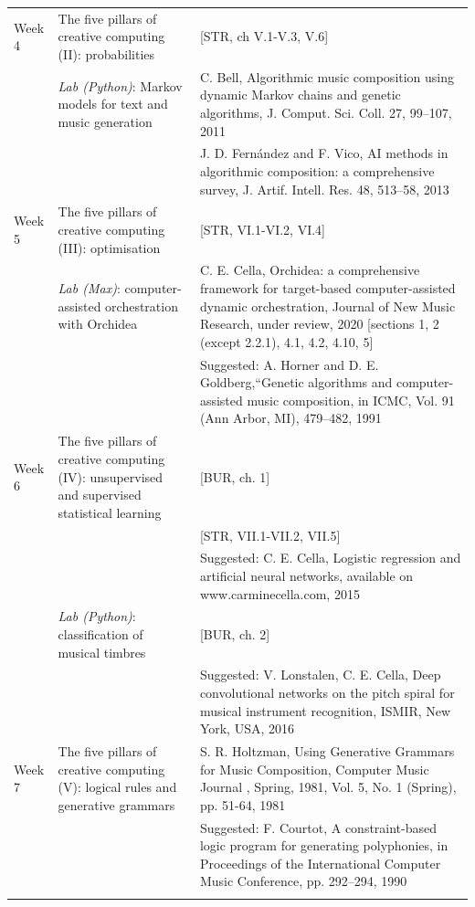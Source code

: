 \documentclass[letterpaper]{inzane_syllabus} %
\begin{document}
\begin{center}
\begin{tabularx}{\textwidth}{p{2cm}p{8cm} @{\hskip 0.5cm} p{9.5cm}}
Week 4 & The five pillars of creative computing (II): probabilities & [STR, ch V.1-V.3, V.6] \\

& \emph{Lab (Python)}: Markov models for text and music generation & C. Bell, Algorithmic music composition using dynamic Markov chains and genetic algorithms, J. Comput. Sci. Coll. 27, 99–107, 2011\\
& & J. D. Fern\'andez and F. Vico, AI methods in algorithmic composition: a comprehensive survey, J. Artif. Intell. Res. 48, 513–58, 2013 \\
\arrayrulecolor{maingray}\hline

Week 5 & The five pillars of creative computing (III): optimisation &  [STR, VI.1-VI.2, VI.4]\\
 
& \emph{Lab (Max)}: computer-assisted orchestration with Orchidea & C. E. Cella, Orchidea: a comprehensive framework for target-based computer-assisted dynamic orchestration, Journal of New Music Research, under review, 2020 [sections 1, 2 (except 2.2.1), 4.1, 4.2, 4.10, 5]  \\
& &  Suggested: A. Horner and D. E. Goldberg,“Genetic algorithms and computer-assisted  music composition, in ICMC, Vol. 91 (Ann Arbor, MI), 479–482, 1991 \\
\arrayrulecolor{maingray}\hline

Week 6 & The five pillars of creative computing (IV): unsupervised and supervised statistical learning & [BUR, ch. 1]\\
& & [STR, VII.1-VII.2, VII.5]\\
& &  Suggested: C. E. Cella, Logistic regression and artificial neural networks, available on www.carminecella.com, 2015 \\

& \emph{Lab (Python)}: classification of musical timbres & [BUR, ch. 2] \\

& & Suggested: V. Lonstalen, C. E. Cella, Deep convolutional networks on the pitch spiral for musical instrument recognition, ISMIR, New York, USA, 2016\\

\arrayrulecolor{maingray}\hline

Week 7 & The five pillars of creative computing (V): logical rules and generative grammars &  S. R. Holtzman, Using Generative Grammars for Music Composition, Computer Music Journal , Spring, 1981, Vol. 5, No. 1 (Spring), pp. 51-64, 1981\\
& & Suggested: F. Courtot, A constraint-based logic program for generating polyphonies, in Proceedings of the International Computer Music Conference, pp. 292–294, 1990 \\
& & \\


\end{tabularx}
\end{center}
\end{document}
